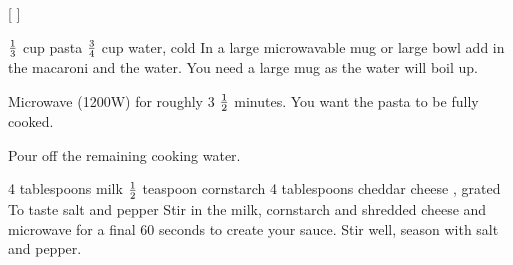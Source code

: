
[
]

\begin{step}
$\frac{1}{3}$ cup pasta
$\frac{3}{4}$ cup water, cold
\method
In a large microwavable mug or large bowl add in the macaroni and the water. You need a large mug as the water will boil up.

Microwave (1200W) for roughly 3 $\frac{1}{2}$ minutes. You want the pasta to be fully cooked.

Pour off the remaining cooking water.
\end{step}

\begin{step}
4 tablespoons milk
$\frac{1}{2}$ teaspoon cornstarch
4 tablespoons cheddar cheese , grated
To taste salt and pepper
\method
Stir in the milk, cornstarch and shredded cheese and microwave for a final 60 seconds to create your sauce. Stir well, season with salt and pepper.
\end{step}